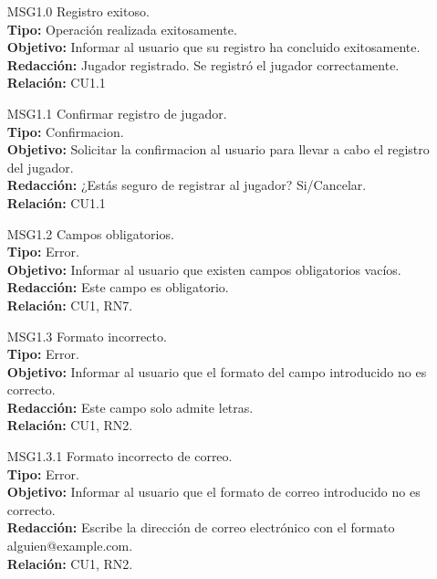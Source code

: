 \begin{itemize}
	
	\item[MSG1.0] Registro exitoso.\\
	\textbf{Tipo:} Operación realizada exitosamente.\\
	\textbf{Objetivo:} Informar al usuario que su registro ha concluido exitosamente.\\
	\textbf{Redacción:} Jugador registrado. Se registró el jugador correctamente.\\
	\textbf{Relación:} CU1.1
	
	\item[MSG1.1] Confirmar registro de jugador.\\
	\textbf{Tipo:} Confirmacion.\\
	\textbf{Objetivo:} Solicitar la confirmacion al usuario para llevar a cabo el registro del jugador.\\
	\textbf{Redacción:} ¿Estás seguro de registrar al jugador? Si/Cancelar.\\
	\textbf{Relación:} CU1.1
	
	\item[MSG1.2] Campos obligatorios.\\
	\textbf{Tipo:} Error.\\
	\textbf{Objetivo:} Informar al usuario que existen campos obligatorios vacíos.\\
	\textbf{Redacción:} Este campo es obligatorio.\\
	\textbf{Relación:} CU1, RN7.
	
	\item[MSG1.3] Formato incorrecto.\\
	 \textbf{Tipo:} Error.\\
	 \textbf{Objetivo:} Informar al usuario que el formato del campo introducido no es correcto.\\
	 \textbf{Redacción:} Este campo solo admite letras. \\
	 \textbf{Relación:} CU1, RN2.
	 
	 \item[MSG1.3.1] Formato incorrecto de correo.\\
	 \textbf{Tipo:} Error.\\
	 \textbf{Objetivo:} Informar al usuario que el formato de correo introducido no es correcto.\\
	 \textbf{Redacción:} Escribe la dirección de correo electrónico con el formato alguien@example.com. \\
	 \textbf{Relación:} CU1, RN2.
	 

\end{itemize}
